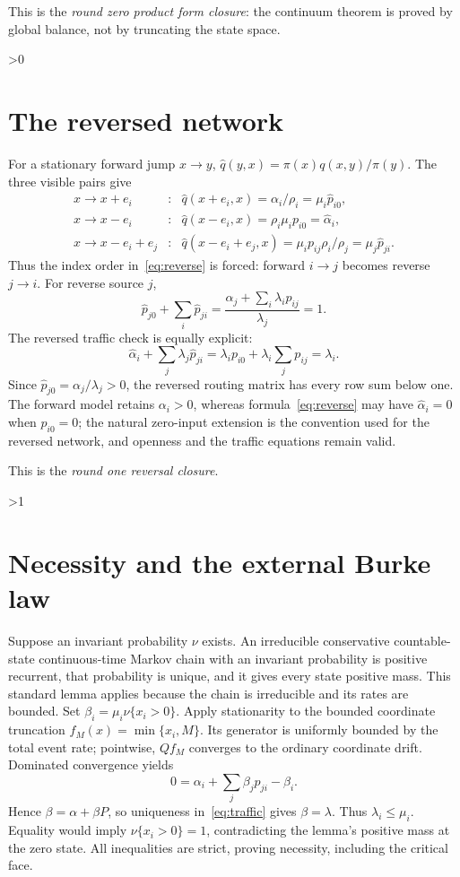 \documentclass[10pt]{article}
\providecommand{\CRevisionRound}{2}
\begin{document}
This is the \emph{round zero product form closure}: the continuum theorem is
proved by global balance, not by truncating the state space.

\ifnum\CRevisionRound>0
\section{The reversed network}
For a stationary forward jump \(x\to y\),
\(\widehat q(y,x)=\pi(x)q(x,y)/\pi(y)\). The three visible pairs give
\begin{equation}\label{eq:jumpreverse}
\begin{array}{rcl}
x\to x+e_i&:&\widehat q(x+e_i,x)=\alpha_i/\rho_i
 =\mu_i\widehat p_{i0},\\
x\to x-e_i&:&\widehat q(x-e_i,x)=\rho_i\mu_ip_{i0}
 =\widehat\alpha_i,\\
x\to x-e_i+e_j&:&\widehat q(x-e_i+e_j,x)
 =\mu_ip_{ij}\rho_i/\rho_j=\mu_j\widehat p_{ji}.
\end{array}
\end{equation}
Thus the index order in~\eqref{eq:reverse} is forced: forward \(i\to j\)
becomes reverse \(j\to i\). For reverse source \(j\),
\[
 \widehat p_{j0}+\sum_i\widehat p_{ji}
 =\frac{\alpha_j+\sum_i\lambda_ip_{ij}}{\lambda_j}=1.
\]
The reversed traffic check is equally explicit:
\[
 \widehat\alpha_i+\sum_j\lambda_j\widehat p_{ji}
 =\lambda_ip_{i0}+\lambda_i\sum_jp_{ij}=\lambda_i .
\]
Since \(\widehat p_{j0}=\alpha_j/\lambda_j>0\), the reversed routing matrix has
every row sum below one. The forward model retains \(\alpha_i>0\), whereas
formula~\eqref{eq:reverse} may have \(\widehat\alpha_i=0\) when \(p_{i0}=0\);
the natural zero-input extension is the convention used for the reversed
network, and openness and the traffic equations remain valid.

This is the \emph{round one reversal closure}.
\fi

\ifnum\CRevisionRound>1
\section{Necessity and the external Burke law}
Suppose an invariant probability \(\nu\) exists. An irreducible conservative
countable-state continuous-time Markov chain with an invariant probability is
positive recurrent, that probability is unique, and it gives every state
positive mass. This standard lemma applies because the chain is irreducible
and its rates are bounded. Set \(\beta_i=\mu_i\nu\{x_i>0\}\). Apply
stationarity to the bounded coordinate
truncation \(f_M(x)=\min\{x_i,M\}\). Its generator is uniformly bounded by the
total event rate; pointwise, \(Qf_M\) converges to the ordinary coordinate
drift. Dominated convergence yields
\[
 0=\alpha_i+\sum_j\beta_jp_{ji}-\beta_i.
\]
Hence \(\beta=\alpha+\beta P\), so uniqueness in~\eqref{eq:traffic} gives
\(\beta=\lambda\). Thus \(\lambda_i\le\mu_i\). Equality would imply
\(\nu\{x_i>0\}=1\), contradicting the lemma's positive mass at the zero state.
All inequalities are strict, proving necessity, including the critical face.
\end{document}
